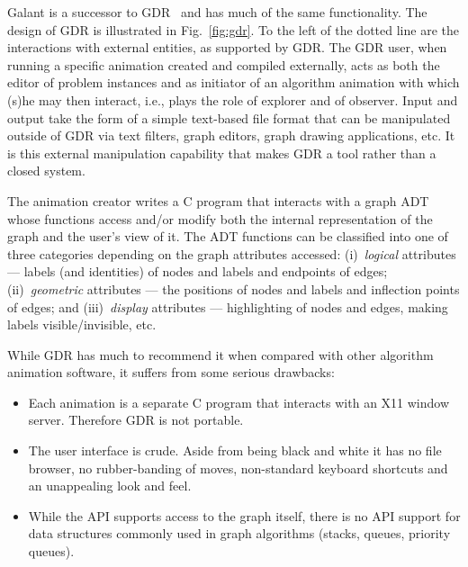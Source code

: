 Galant is a successor to
GDR~\cite{1991-TR_NCSU_CSC-Stallmann,1992-CSDM-Stallmann} and has much of the
same functionality.
The design of GDR is illustrated in Fig.~\ref{fig:gdr}.
To the left of the dotted line are the interactions with external entities,
as supported by GDR.
The GDR user, when running a specific animation created and compiled
externally, acts as both the editor of problem instances and as initiator of an
algorithm animation with which (s)he may then interact, i.e., plays the role
of explorer and of observer. 
Input and output take the form of a simple text-based file format that can be
manipulated outside of GDR via text filters, graph editors, graph drawing
applications, etc. It is this external manipulation capability
that makes GDR a tool rather than a
closed system.

The animation creator writes a C program that interacts with a graph ADT
whose functions access and/or modify both the internal representation of the
graph and the user's view of it. The ADT functions can be classified into one
of three categories depending on the graph attributes accessed:
(i)~\emph{logical} attributes --- labels (and identities) of nodes and labels
and endpoints of edges; (ii)~\emph{geometric} attributes --- the positions of
nodes and labels and
inflection points of edges; and (iii)~\emph{display} attributes ---
highlighting of nodes and edges, making labels visible/invisible, etc. 

While GDR has much to recommend it when compared with other algorithm
animation software, it suffers from some serious drawbacks:

\begin{itemize}
\item
  Each animation is a separate C program that interacts with an X11 window
  server.
  Therefore GDR is not portable.
\item
  The user interface is crude. Aside from being black and white it has no
  file browser, no rubber-banding of moves, non-standard keyboard shortcuts
  and an unappealing look and feel.
\item
  While the API supports access to the graph itself, there is no API support for
  data structures commonly used in graph algorithms (stacks, queues, priority
  queues).
\end{itemize}

